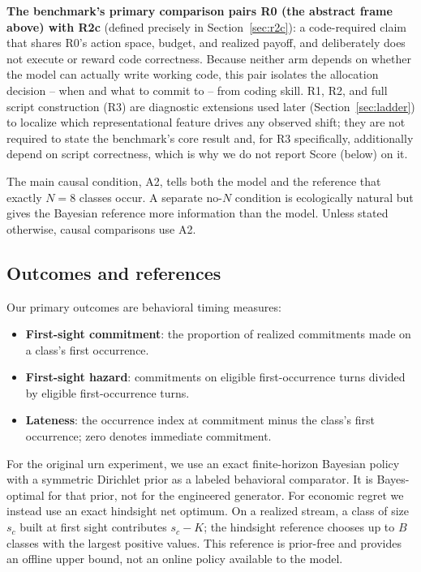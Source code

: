 \documentclass{article}
\begin{document}
\textbf{The benchmark's primary comparison pairs R0 (the abstract frame above)
with R2c} (defined precisely in Section~\ref{sec:r2c}): a code-required claim
that shares R0's action space, budget, and realized payoff, and deliberately
does not execute or reward code correctness. Because neither arm depends on
whether the model can actually write working code, this pair isolates the
allocation decision -- when and what to commit to -- from coding skill. R1, R2,
and full script construction (R3) are diagnostic extensions used later
(Section~\ref{sec:ladder}) to localize which representational
feature drives any observed shift; they are not required to state the
benchmark's core result and, for R3 specifically, additionally depend on
script correctness, which is why we do not report Score (below) on it.

The main causal condition, A2, tells both the model and the reference that
exactly $N=8$ classes occur. A separate no-$N$ condition is ecologically
natural but gives the Bayesian reference more information than the model.
Unless stated otherwise, causal comparisons use A2.

\subsection{Outcomes and references}
\label{sec:outcomes}

Our primary outcomes are behavioral timing measures:
\begin{itemize}
    \item \textbf{First-sight commitment}: the proportion of realized
    commitments made on a class's first occurrence.
    \item \textbf{First-sight hazard}: commitments on eligible first-occurrence
    turns divided by eligible first-occurrence turns.
    \item \textbf{Lateness}: the occurrence index at commitment minus the
    class's first occurrence; zero denotes immediate commitment.
\end{itemize}

For the original urn experiment, we use an exact finite-horizon Bayesian policy
with a symmetric Dirichlet prior as a labeled behavioral comparator. It is
Bayes-optimal for that prior, not for the engineered generator. For economic
regret we instead use an exact hindsight net optimum. On a realized stream, a
class of size $s_c$ built at first sight contributes $s_c-K$; the hindsight
reference chooses up to $B$ classes with the largest positive values. This
reference is prior-free and provides an offline upper bound, not an online
policy available to the model.
\end{document}

